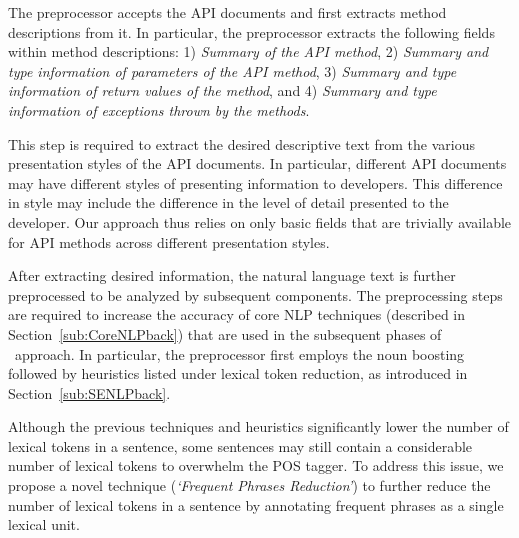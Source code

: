 The preprocessor accepts the API documents and first extracts method descriptions from it.
In particular, the preprocessor extracts the following fields within method descriptions: 
1) \textit{Summary of the API method},
2) \textit{Summary and type information of parameters of the API method}, 
3) \textit{Summary and type information of return values of the method}, and
4) \textit{Summary and type information of exceptions thrown by the methods}.

This step is required to extract the desired descriptive text from the various presentation styles of the API documents.
In particular, different API documents may have different styles of presenting information to developers.
This difference in style may include the difference in the level of detail presented to the developer.
Our approach thus relies on only basic fields that are trivially available for API methods across different presentation styles. 

After extracting desired information, the natural language text is further preprocessed to be analyzed by subsequent components.
The preprocessing steps are required to increase the accuracy of core NLP techniques (described in Section~\ref{sub:CoreNLPback}) that are used in the subsequent phases of \tool\ approach.
In particular, the preprocessor first employs the noun boosting followed by heuristics listed under lexical token reduction, as introduced in Section~\ref{sub:SENLPback}.

Although the previous techniques and heuristics significantly lower the number of lexical tokens in a sentence, some sentences may still contain a considerable number of lexical tokens to overwhelm the POS tagger.
To address this issue, we propose a novel technique (\textit{`Frequent Phrases Reduction'}) to further reduce the number of lexical tokens in a sentence by annotating frequent phrases as a single lexical unit.

